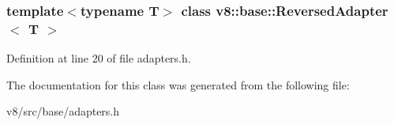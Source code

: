 \subsubsection*{template$<$typename T$>$\newline
class v8\+::base\+::\+Reversed\+Adapter$<$ T $>$}



Definition at line 20 of file adapters.\+h.



The documentation for this class was generated from the following file\+:\begin{DoxyCompactItemize}
\item 
v8/src/base/adapters.\+h\end{DoxyCompactItemize}

